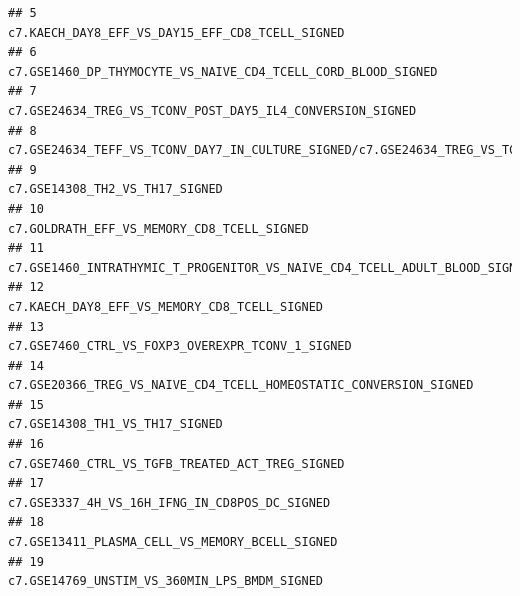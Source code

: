 \documentclass{article}\usepackage[]{graphicx}\usepackage[]{color}
\makeatletter
\newenvironment{kframe}{%
 \def\at@end@of@kframe{}%
 \ifinner\ifhmode%
  \def\at@end@of@kframe{\end{minipage}}%
  \begin{minipage}{\columnwidth}%
 \fi\fi%
 \def\FrameCommand##1{\hskip\@totalleftmargin \hskip-\fboxsep
 \colorbox{shadecolor}{##1}\hskip-\fboxsep
     \hskip-\linewidth \hskip-\@totalleftmargin \hskip\columnwidth}%
 \MakeFramed {\advance\hsize-\width
   \@totalleftmargin\z@ \linewidth\hsize
   \@setminipage}}%
 {\par\unskip\endMakeFramed%
 \at@end@of@kframe}
\newenvironment{knitrout}{}{} %
\makeatother
\begin{document}
\begin{knitrout}
\begin{kframe}
\begin{verbatim}
## 5                                                                                                                                     c7.KAECH_DAY8_EFF_VS_DAY15_EFF_CD8_TCELL_SIGNED
## 6                                                                                                                        c7.GSE1460_DP_THYMOCYTE_VS_NAIVE_CD4_TCELL_CORD_BLOOD_SIGNED
## 7                                                                                                                           c7.GSE24634_TREG_VS_TCONV_POST_DAY5_IL4_CONVERSION_SIGNED
## 8                                                                          c7.GSE24634_TEFF_VS_TCONV_DAY7_IN_CULTURE_SIGNED/c7.GSE24634_TREG_VS_TCONV_POST_DAY7_IL4_CONVERSION_SIGNED
## 9                                                                                                                                                      c7.GSE14308_TH2_VS_TH17_SIGNED
## 10                                                                                                                                         c7.GOLDRATH_EFF_VS_MEMORY_CD8_TCELL_SIGNED
## 11                                                                                                          c7.GSE1460_INTRATHYMIC_T_PROGENITOR_VS_NAIVE_CD4_TCELL_ADULT_BLOOD_SIGNED
## 12                                                                                                                                       c7.KAECH_DAY8_EFF_VS_MEMORY_CD8_TCELL_SIGNED
## 13                                                                                                                                   c7.GSE7460_CTRL_VS_FOXP3_OVEREXPR_TCONV_1_SIGNED
## 14                                                                                                                  c7.GSE20366_TREG_VS_NAIVE_CD4_TCELL_HOMEOSTATIC_CONVERSION_SIGNED
## 15                                                                                                                                                     c7.GSE14308_TH1_VS_TH17_SIGNED
## 16                                                                                                                                    c7.GSE7460_CTRL_VS_TGFB_TREATED_ACT_TREG_SIGNED
## 17                                                                                                                                      c7.GSE3337_4H_VS_16H_IFNG_IN_CD8POS_DC_SIGNED
## 18                                                                                                                                     c7.GSE13411_PLASMA_CELL_VS_MEMORY_BCELL_SIGNED
## 19                                                                                                                                       c7.GSE14769_UNSTIM_VS_360MIN_LPS_BMDM_SIGNED

\end{verbatim}
\end{kframe}
\end{knitrout}
\end{document}
